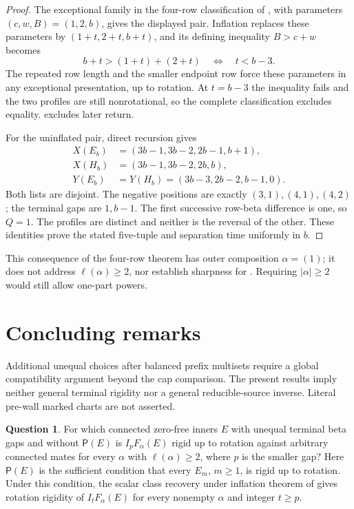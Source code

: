 \documentclass[11pt,a4paper]{amsart}
\numberwithin{equation}{section}
\theoremstyle{plain}
\theoremstyle{definition}
\newtheorem{question}[theorem]{Question}
\begin{document}
\begin{proof}
The exceptional family in the four-row classification of
\cite{Shields2026NegativeCount}, with parameters
\((c,w,B)=(1,2,b)\), gives the displayed pair.  Inflation replaces
these parameters by \((1+t,2+t,b+t)\), and its defining inequality
\(B>c+w\) becomes
\[
 b+t>(1+t)+(2+t)\quad\Longleftrightarrow\quad t<b-3.
\]
The repeated row length and the smaller endpoint row force these
parameters in any exceptional presentation, up to rotation.  At
\(t=b-3\) the inequality fails and the two profiles are still
nonrotational, so the complete classification excludes equality.
 excludes later return.

For the uninflated pair, direct recursion gives
\[
 \begin{aligned}
 X(E_b)&=(3b-1,3b-2,2b-1,b+1),\\
 X(H_b)&=(3b-1,3b-2,2b,b),\\
 Y(E_b)&=Y(H_b)=(3b-3,2b-2,b-1,0).
 \end{aligned}
\]
Both lists are disjoint.  The negative positions are exactly
\((3,1),(4,1),(4,2)\); the terminal gaps are \(1,b-1\).
The first successive row-beta difference is one, so \(Q=1\).
The profiles are distinct and neither is the reversal of the other.
These identities prove the stated five-tuple and separation time
uniformly in \(b\).
\end{proof}

This consequence of the four-row theorem has outer composition
\(\alpha=(1)\); it does not address \(\ell(\alpha)\ge2\),
nor establish sharpness for .  Requiring
\(|\alpha|\ge2\) would still allow one-part powers.

\section{Concluding remarks}\label{sec:conclusion}

Additional unequal choices after balanced prefix multisets require a
global compatibility argument beyond the cap comparison.  The present
results imply neither general terminal rigidity nor a general
reducible-source inverse.  Literal pre-wall marked charts are not asserted.

\begin{question}\label{q:multiple-parts}
For which connected zero-free inners \(E\) with unequal terminal beta
gaps and without \(\mathsf P(E)\) is \(I_pF_\alpha(E)\) rigid up to
rotation against arbitrary connected mates for every \(\alpha\) with
\(\ell(\alpha)\ge2\), where \(p\) is the smaller gap?
Here \(\mathsf P(E)\) is the sufficient condition that every
\(E_m\), \(m\ge1\), is rigid up to rotation.  Under this condition,
the scalar class recovery under inflation theorem of
\cite{Shields2026HessenbergRecognition} gives rotation rigidity of
\(I_tF_\alpha(E)\) for every nonempty \(\alpha\) and integer \(t\ge p\).
\end{question}
\end{document}
